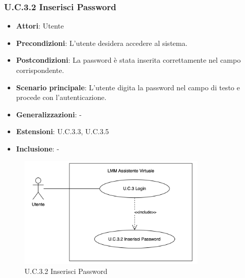\subsubsection{U.C.3.2 Inserisci Password}
\begin{itemize}
    \item \textbf{Attori}: Utente
    \item \textbf{Precondizioni}: L'utente desidera accedere al sistema.  
    \item \textbf{Postcondizioni}: La password è stata inserita correttamente nel campo corrispondente.
    \item \textbf{Scenario principale}: L'utente digita la password nel campo di testo e procede con l'autenticazione.
    \item \textbf{Generalizzazioni}: -
    \item \textbf{Estensioni}: U.C.3.3, U.C.3.5
    \item \textbf{Inclusione}: -
\end{itemize}
\begin{figure}[H]
    \centering
    \includegraphics[width=0.8\textwidth]{img/U.C.3.2.png}
    \caption{U.C.3.2 Inserisci Password}
\end{figure}
\newpage 

